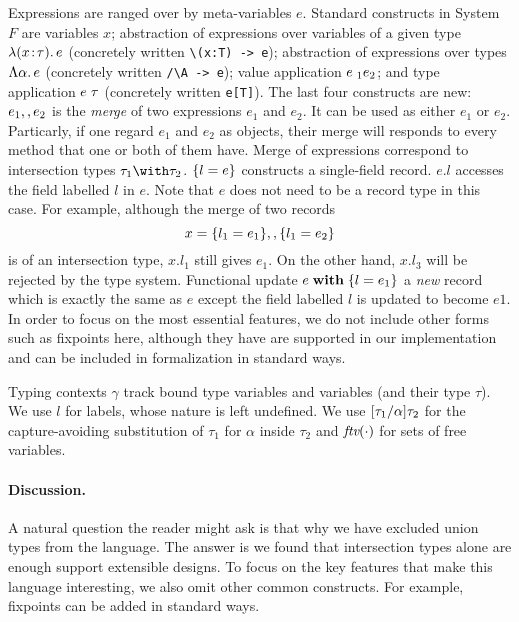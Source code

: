Expressions are ranged over by meta-variables $e$. 
Standard constructs in System $F$ are 
variables $ x $; 
abstraction of expressions over variables of a given type $ \lambda (x \!:\! \tau).\, e $ (concretely written \lstinline$\(x:T) -> e$); 
abstraction of expressions over types $ \Lambda \alpha.\, e $ (concretely written \lstinline$/\A -> e$); 
value application $ e \; _1 e_2 $;
and type application $ e \; \tau $ (concretely written \lstinline$e[T]$). 
The last four constructs are new: $ e_1 ,, e_2 $ 
is the \emph{merge} of two expressions $ e_1 $ and $ e_2 $.
It can be used as either $ e_1 $ or $ e_2 $. Particarly, if one regard $ e_1 $
and $ e_2 $ as objects, their merge will responds to every method that one or
both of them have. Merge of expressions correspond to intersection types
$ \tau_1 \andop \tau_2 $. $ \{ l = e \} $ constructs a single-field record.
$ e.l $ accesses the field labelled $ l $ in $ e $. Note that $ e $ does not
need to be a record type in this case. For example, although the merge of two
records
\[
x = \{ l_1 = e_1 \} ,, \{ l_1 = e_2 \} 
\]
is of an intersection type, $ x.{l_1} $ still gives $ e_1 $. On the other hand,
$ x.{l_3} $ will be rejected by the type system. Functional update $ e \; \mathbf{with} \; \{l = e_1\} $ a
\emph{new} record which is exactly the same as $ e $ except the field labelled
$ l $ is updated to become $ e1 $. In order to focus on the most essential
features, we do not include other forms such as fixpoints here, although they
have are supported in our implementation and can be included in formalization in
standard ways.


Typing contexts $ \gamma $ track bound type variables and variables (and their
type $\tau$). We use $l$ for labels, whose nature is left undefined. We use
$\lbrack \tau_1 / \alpha \rbrack {\tau_2}$ for the capture-avoiding substitution of
$\tau_1$ for $\alpha$ inside $\tau_2$ and $\textit{ftv}({\cdot})$ for sets of free
variables.

\paragraph{Discussion.} A natural question the reader might ask is that why we
have excluded union types from the language. The answer is we found that
intersection types alone are enough support extensible designs. To focus on the
key features that make this language interesting, we also omit other common
constructs. For example, fixpoints can be added in standard ways.

